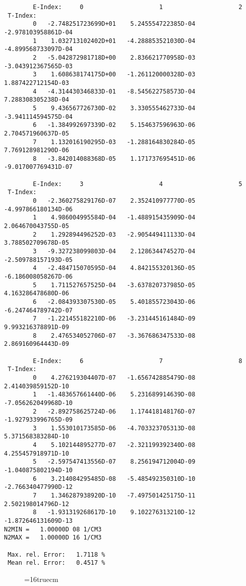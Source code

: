 \documentclass[12pt,dvipdfmx]{article}
\begin{document}
\begin{small}\begin{verbatim}
        E-Index:     0                     1                     2
 T-Index:
        0   -2.748251723699D+01    5.245554722385D-04   -2.978103958861D-04
        1    1.032713102402D+01   -4.288853521030D-04   -4.899568733097D-04
        2   -5.042872981718D+00    2.836621770958D-03   -3.043912367565D-03
        3    1.608638174175D+00   -1.261120000328D-03    1.887422712154D-03
        4   -4.314430346833D-01   -8.545622758573D-04    7.288308305238D-04
        5    9.436567726730D-02    3.330555462733D-04   -3.941114594575D-04
        6   -1.384992697339D-02    5.154637596963D-06    2.704571960637D-05
        7    1.132016190295D-03   -1.288164830284D-05    7.769128981290D-06
        8   -3.842014088368D-05    1.171737695451D-06   -9.017007769431D-07

        E-Index:     3                     4                     5
 T-Index:
        0   -2.360275829176D-07    2.352410977770D-05   -4.997866180134D-06
        1    4.986004995584D-04   -1.488915435909D-04    2.064670043755D-05
        2    1.292894496252D-03   -2.905449411133D-04    3.788502709678D-05
        3   -9.327238099803D-04    2.128634474527D-04   -2.509788157193D-05
        4   -2.484715070595D-04    4.842155320136D-05   -6.186008058267D-06
        5    1.711527657525D-04   -3.637820737985D-05    4.163286478680D-06
        6   -2.084393307530D-05    5.401855723043D-06   -6.247464789742D-07
        7   -1.221455182210D-06   -3.231445161484D-09    9.993216378891D-09
        8    2.476534052706D-07   -3.367686347533D-08    2.869160964443D-09

        E-Index:     6                     7                     8
 T-Index:
        0    4.276219304407D-07   -1.656742885479D-08    2.414039859152D-10
        1   -1.483657661440D-06    5.231689914639D-08   -7.056262049968D-10
        2   -2.892758625724D-06    1.174418148176D-07   -1.927933996765D-09
        3    1.553010173585D-06   -4.703323705313D-08    5.371568383284D-10
        4    5.102144895277D-07   -2.321199392340D-08    4.255457918971D-10
        5   -2.597547413556D-07    8.256194712004D-09   -1.040875802194D-10
        6    3.214084295485D-08   -5.485492350310D-10   -2.766340477990D-12
        7    1.346287938920D-10   -7.497501425175D-11    2.502198014796D-12
        8   -1.931319268617D-10    9.102276313210D-12   -1.872646131609D-13
N2MIN =   1.00000D 08 1/CM3
N2MAX =   1.00000D 16 1/CM3

 Max. rel. Error:   1.7118 %
 Mean rel. Error:   0.4517 %

\end{verbatim}\end{small}
\begin{figure} \label{2.2.5}
\epsfxsize=16truecm
\end{figure}
\newpage
\end{document}
